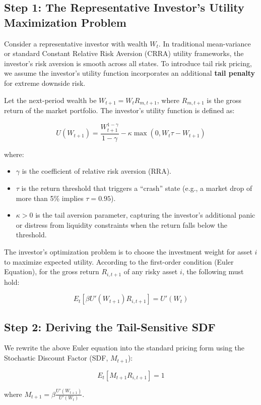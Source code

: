\documentclass[12pt]{article}
\begin{document}
\subsection{Step 1: The Representative Investor's Utility Maximization Problem}

Consider a representative investor with wealth $W_t$. In traditional mean-variance or standard Constant Relative Risk Aversion (CRRA) utility frameworks, the investor's risk aversion is smooth across all states. To introduce tail risk pricing, we assume the investor's utility function incorporates an additional \textbf{tail penalty} for extreme downside risk.

Let the next-period wealth be $W_{t+1} = W_t R_{m,t+1}$, where $R_{m,t+1}$ is the gross return of the market portfolio. The investor's utility function is defined as:

$$U(W_{t+1}) = \frac{W_{t+1}^{1-\gamma}}{1-\gamma} - \kappa \max(0, W_t \tau - W_{t+1})$$

where:
\begin{itemize}
    \item $\gamma$ is the coefficient of relative risk aversion (RRA).
    \item $\tau$ is the return threshold that triggers a ``crash'' state (e.g., a market drop of more than 5\% implies $\tau = 0.95$).
    \item $\kappa > 0$ is the tail aversion parameter, capturing the investor's additional panic or distress from liquidity constraints when the return falls below the threshold.
\end{itemize}

The investor's optimization problem is to choose the investment weight for asset $i$ to maximize expected utility. According to the first-order condition (Euler Equation), for the gross return $R_{i,t+1}$ of any risky asset $i$, the following must hold:

$$E_t [\beta U'(W_{t+1}) R_{i,t+1}] = U'(W_t)$$

\subsection{Step 2: Deriving the Tail-Sensitive SDF}

We rewrite the above Euler equation into the standard pricing form using the Stochastic Discount Factor (SDF, $M_{t+1}$):

$$E_t [M_{t+1} R_{i,t+1}] = 1$$

where $M_{t+1} = \beta \frac{U'(W_{t+1})}{U'(W_t)}$.
\end{document}

